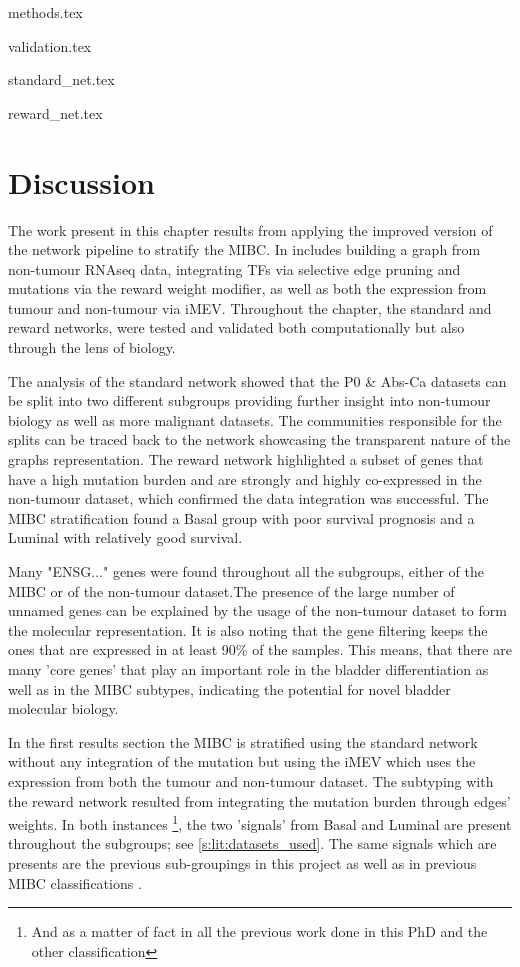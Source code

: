 {methods.tex}

{validation.tex}

{standard_net.tex}

{reward_net.tex}

\section{Discussion}

The work present in this chapter results from applying the improved version of the network pipeline to stratify the MIBC. In includes building a graph from non-tumour RNAseq data, integrating TFs via selective edge pruning and mutations via the reward weight modifier, as well as both the expression from tumour and non-tumour via iMEV. Throughout the chapter, the standard and reward networks, were tested and validated both computationally but also through the lens of biology. 

The analysis of the standard network showed that the P0 \& Abs-Ca datasets can be split into two different subgroups providing further insight into non-tumour biology as well as more malignant datasets. The communities responsible for the splits can be traced back to the network showcasing the transparent nature of the graphs representation. The reward network highlighted a subset of genes that have a high mutation burden and are strongly and highly co-expressed in the non-tumour dataset, which confirmed the data integration was successful. The MIBC stratification found a Basal group with poor survival prognosis and a Luminal with relatively good survival.

Many "ENSG..." genes were found throughout all the subgroups, either of the MIBC or of the non-tumour dataset.The presence of the large number of unnamed genes can be explained by the usage of the non-tumour dataset to form the molecular representation. It is also noting that the gene filtering keeps the ones that are expressed in at least 90\% of the samples. This means, that there are many 'core genes' that play an important role in the bladder differentiation as well as in the MIBC subtypes, indicating the potential for novel bladder molecular biology. 

In the first results section the MIBC is stratified using the standard network without any integration of the mutation but using the iMEV which uses the expression from both the tumour and non-tumour dataset. The subtyping with the reward network resulted from integrating the mutation burden through edges' weights. In both instances \footnote{And as a matter of fact in all the previous work done in this PhD and the other classification}, the two 'signals' from Basal and Luminal are present throughout the subgroups; see \cref{s:lit:datasets_used}. The same signals which are presents are the previous sub-groupings in this project as well as in previous MIBC classifications \citet{Robertson2017-mg, Kamoun2020-tj, Marzouka2018-ge}.

